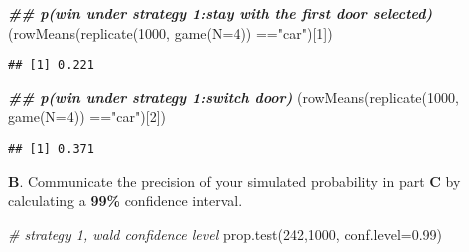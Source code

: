 \documentclass[
]{article}
\newenvironment{Shaded}{\begin{snugshade}}{\end{snugshade}}
\newcommand{\AttributeTok}[1]{\textcolor[rgb]{0.77,0.63,0.00}{#1}}
\newcommand{\CommentTok}[1]{\textcolor[rgb]{0.56,0.35,0.01}{\textit{#1}}}
\newcommand{\ControlFlowTok}[1]{\textcolor[rgb]{0.13,0.29,0.53}{\textbf{#1}}}
\newcommand{\DecValTok}[1]{\textcolor[rgb]{0.00,0.00,0.81}{#1}}
\newcommand{\DocumentationTok}[1]{\textcolor[rgb]{0.56,0.35,0.01}{\textbf{\textit{#1}}}}
\newcommand{\FloatTok}[1]{\textcolor[rgb]{0.00,0.00,0.81}{#1}}
\newcommand{\FunctionTok}[1]{\textcolor[rgb]{0.00,0.00,0.00}{#1}}
\newcommand{\NormalTok}[1]{#1}
\newcommand{\SpecialCharTok}[1]{\textcolor[rgb]{0.00,0.00,0.00}{#1}}
\newcommand{\StringTok}[1]{\textcolor[rgb]{0.31,0.60,0.02}{#1}}
\begin{document}
\begin{Shaded}
\end{Shaded}

\begin{Shaded}
\begin{Highlighting}[]
\DocumentationTok{\#\# p(win under strategy 1:stay with the first door selected)}
\NormalTok{(}\FunctionTok{rowMeans}\NormalTok{(}\FunctionTok{replicate}\NormalTok{(}\DecValTok{1000}\NormalTok{, }\FunctionTok{game}\NormalTok{(}\AttributeTok{N=}\DecValTok{4}\NormalTok{)) }\SpecialCharTok{==}\StringTok{"car"}\NormalTok{)[}\DecValTok{1}\NormalTok{])}
\end{Highlighting}
\end{Shaded}

\begin{verbatim}
## [1] 0.221
\end{verbatim}

\begin{Shaded}
\begin{Highlighting}[]
\DocumentationTok{\#\# p(win under strategy 1:switch door)}
\NormalTok{(}\FunctionTok{rowMeans}\NormalTok{(}\FunctionTok{replicate}\NormalTok{(}\DecValTok{1000}\NormalTok{, }\FunctionTok{game}\NormalTok{(}\AttributeTok{N=}\DecValTok{4}\NormalTok{)) }\SpecialCharTok{==}\StringTok{"car"}\NormalTok{)[}\DecValTok{2}\NormalTok{])}
\end{Highlighting}
\end{Shaded}

\begin{verbatim}
## [1] 0.371
\end{verbatim}

\textbf{B}. Communicate the precision of your simulated probability in
part \textbf{C} by calculating a \textbf{99\%} confidence interval.

\begin{Shaded}
\begin{Highlighting}[]
\CommentTok{\# strategy 1, wald confidence level}
\FunctionTok{prop.test}\NormalTok{(}\DecValTok{242}\NormalTok{,}\DecValTok{1000}\NormalTok{, }\AttributeTok{conf.level=}\FloatTok{0.99}\NormalTok{)}
\end{Highlighting}
\end{Shaded}
\end{document}
